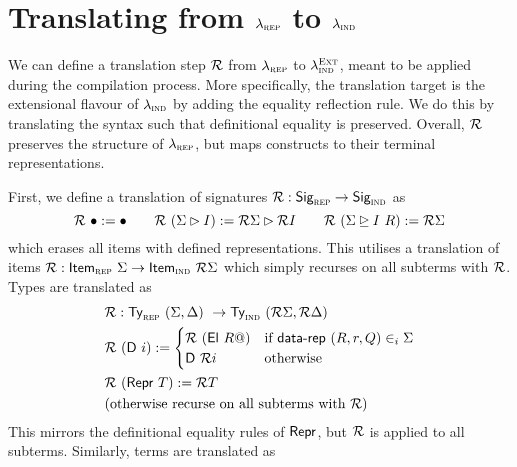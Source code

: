 \section{Translating from $\lambda_{\textsc{rep}}$ to $\lambda_{\textsc{ind}}$}

We can define a translation step $\mathcal{R}$ from $\lambda_{\textsc{rep}}$ to
$\lambda_{\textsc{ind}}^{\textsc{Ext}}$, meant to be applied during the compilation process.
More specifically, the translation target is the extensional flavour of
$\lambda_{\textsc{ind}}$ by adding the equality reflection rule. We do this by translating
the syntax \cite{Boulier2017-cm} such that definitional equality is preserved.
Overall, $\mathcal{R}$ preserves the structure of $\lambda_{\textsc{rep}}$, but maps constructs to
their terminal representations.

First, we define a translation of signatures $\mathcal{R} : \textsf{Sig}_{\textsc{rep}} \to \textsf{Sig}_{\textsc{ind}}$ as
\[
\mathcal{R}\ \bullet := \bullet \qquad \mathcal{R}\ (\Sigma \rhd I) := \mathcal{R} \Sigma \rhd \mathcal{R} I \qquad \mathcal{R}\ (\Sigma \unrhd I \ R) := \mathcal{R} \Sigma
\]
which erases all items with defined representations.
This utilises a translation of items $\mathcal{R} : \textsf{Item}_{\textsc{rep}}\ \Sigma \to \textsf{Item}_{\textsc{ind}}\ \mathcal{R}
\Sigma$ which simply recurses on all subterms with $\mathcal{R}$.
Types are translated as
\begin{align*}
  & \mathcal{R} : \textsf{Ty}_{\textsc{rep}}\ (\Sigma, \Delta)\ \to \textsf{Ty}_{\textsc{ind}}\ (\mathcal{R} \Sigma, \mathcal{R} \Delta) \\
  & \mathcal{R}\ (\textsf{D}\ i) := \begin{cases}
  \mathcal{R}\ (\textsf{El}\ R@) & \text{if $\textsf{data-rep}\ (R, r, Q) \in_i \Sigma$} \\
  \textsf{D}\ \mathcal{R} i & \text{otherwise}
  \end{cases} \\
  & \mathcal{R}\ (\textsf{Repr}\ T) := \mathcal{R} T \\
  & \text{(otherwise recurse on all subterms with $\mathcal{R}$)}
\end{align*}
This mirrors the definitional equality rules of $\textsf{Repr}$, but $\mathcal{R}$ is applied
to all subterms.
Similarly, terms are translated as
